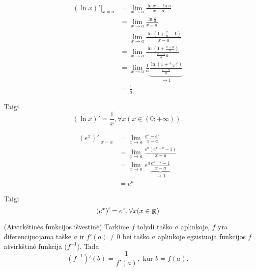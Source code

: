\begin{exmp}
  \begin{align*}
    (\ln x)'|_{x = a}
    &= \lim _{x \to a} \frac{\ln x - \ln a}{x - a} \\
    &= \lim _{x \to a} \frac{\ln \frac{x}{a}}{x - a} \\
    &= \lim _{x \to a} 
      \frac{\ln \left( 1 + \frac{x}{a} - 1 \right)}{x - a} \\
    &= \lim _{x \to a} 
      \frac{\ln \left( 1 + \frac{x - a}{a} \right)}{\frac{x - a}{a} a} \\
    &= \lim _{x \to a} 
      \frac{1}{a}
      \underbrace{
        \frac{\ln \left( 1 + \frac{x - a}{a} \right)}{\frac{x - a}{a}}
        }_{\to 1} \\
    &= \frac{1}{a}
  \end{align*}

  Taigi
  \begin{equation*}
    (\ln x)' = \frac{1}{x}, \forall x (x \in (0; +\infty)).
  \end{equation*}
\end{exmp}

\begin{exmp}
  \begin{align*}
    (e^{x})'|_{x = a} 
    &= \lim _{x \to a} \frac{e^{x} - e^{a}}{x - a} \\
    &= \lim _{x \to a} \frac{e^{a} (e^{x-a} - 1)}{x - a} \\
    &= \lim _{x \to a} e^{a}
      \underbrace{\frac{e^{x - a} - 1}{x - a}}_{\to 1} \\
    &= e^{a}
  \end{align*}

  Taigi
  \begin{equation*}
    (e^{x})' = e^{x}, \forall x (x \in \mathop{\mathbb{R}})
  \end{equation*}
\end{exmp}

\begin{prop}
  (Atvirkštinės funkcijos išvestinė) Tarkime $f$ tolydi taško $a$ 
  aplinkoje, $f$ yra diferencijuojama taške $a$ ir $f'(a) \neq 0$ 
  bei taško $a$ aplinkoje egzistuoja funkcijos
  $f$ atvirkštinė funkcija ($f^{-1}$). Tada
  \begin{equation*}
    (f^{-1})'(b) = \frac{1}{f'(a)}, \text{ kur } b = f(a).
  \end{equation*}
\end{prop}

